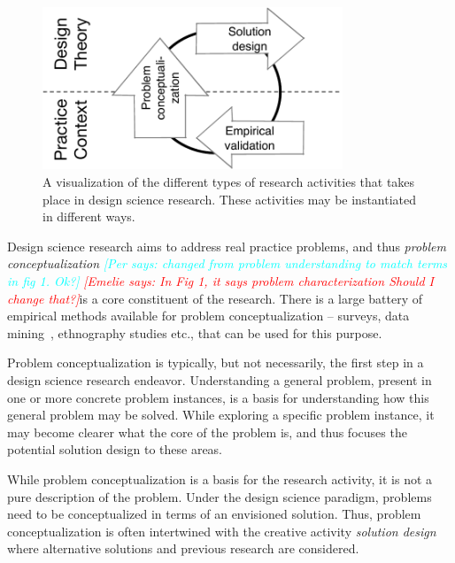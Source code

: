 \documentclass[graybox]{svmult}
\newcommand{\emelie}[1]{\textcolor{red}{{\it [Emelie says: #1]}}}
\newcommand{\per}[1]{\textcolor{cyan}{{\it [Per says: #1]}}}
\newcommand{\emelie}[1]{}
\newcommand{\per}[1]{}
\begin{document}
\begin{figure}[t]
\centering
 \includegraphics[width=0.8\textwidth]{Figures/DSSE_process.pdf}
\caption{A visualization of the different types of research activities that takes place in design science research. These activities may be instantiated in different ways.}
\label{fig:DS_process}       %
\end{figure}

Design science research aims to address real practice problems, and thus \emph{problem conceptualization} \per{changed from problem understanding to match terms in fig 1. Ok?} \emelie{In Fig 1, it says problem characterization Should I change that?}is a core constituent of the research. There is a large battery of empirical methods available for problem conceptualization -- surveys, data mining~\cite{MenziesDataMining2016}, ethnography studies \cite{SharpEthnography2016} etc., that can be used for this purpose. 

Problem conceptualization is typically, but not necessarily, the first step in a design science research endeavor. Understanding a general problem, present in one or more concrete problem instances, is a basis for understanding how this general problem may be solved.  While exploring a specific problem instance,  it may become clearer what the core of the problem is, and thus focuses the potential solution design to these areas. 

While problem conceptualization is a basis for the research activity, it is not a pure description of the problem. Under the design science paradigm, problems need to be conceptualized in terms of an envisioned solution. Thus, problem conceptualization is often intertwined with the creative activity \emph{solution design} where alternative solutions and previous research are considered. 

\end{document}
